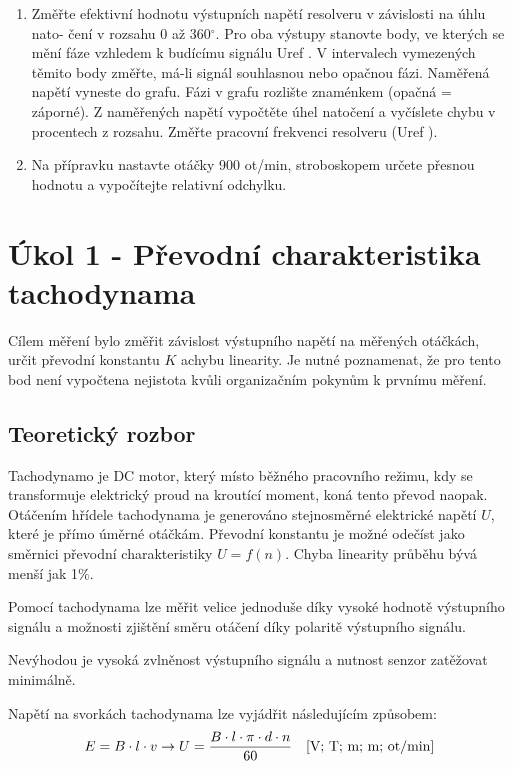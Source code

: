 \documentclass{protokol}
\begin{document}
\begin{enumerate}
        \item   Změřte efektivní hodnotu výstupních napětí resolveru v závislosti na úhlu nato-
                čení v rozsahu 0 až 360$^\circ$. Pro oba výstupy stanovte body, ve kterých se mění fáze
                vzhledem k budícímu signálu Uref . V intervalech vymezených těmito body změřte,
                má-li signál souhlasnou nebo opačnou fázi. Naměřená napětí vyneste do grafu. Fázi
                v grafu rozlište znaménkem (opačná = záporné). Z naměřených napětí vypočtěte
                úhel natočení a vyčíslete chybu v procentech z rozsahu. Změřte pracovní frekvenci
                resolveru (Uref ).

        \item   Na přípravku nastavte otáčky 900 ot/min, stroboskopem určete přesnou hodnotu a
                vypočítejte relativní odchylku.
    \end{enumerate}


\section{Úkol 1 - Převodní charakteristika tachodynama}
    Cílem měření bylo změřit závislost výstupního napětí na měřených otáčkách, určit převodní konstantu $K$ achybu linearity. Je nutné poznamenat, 
    že pro tento bod není vypočtena nejistota kvůli organizačním pokynům k prvnímu měření. 
    \subsection{Teoretický rozbor}
    Tachodynamo je DC motor, který místo běžného pracovního režimu, kdy se transformuje elektrický proud na kroutící moment, koná tento převod naopak.
    Otáčením hřídele tachodynama je generováno stejnosměrné elektrické napětí $U$, které je přímo úměrné otáčkám. Převodní konstantu je možné
    odečíst jako směrnici převodní charakteristiky $U = f(n)$. Chyba linearity průběhu bývá menší jak 1$\%$\cite{navod}.

    Pomocí tachodynama lze měřit velice jednoduše díky vysoké hodnotě výstupního signálu a možnosti zjištění směru otáčení díky polaritě výstupního signálu. 
    
    Nevýhodou je vysoká zvlněnost výstupního signálu a nutnost senzor zatěžovat minimálně. 

    Napětí na svorkách tachodynama lze vyjádřit následujícím způsobem:
    \begin{equation}
        E = B \cdot l \cdot v \rightarrow U = \dfrac{B \cdot l \cdot \pi \cdot d \cdot n}{60} \text{\quad [V; T; m; m; ot/min]}
    \end{equation}  
    
\end{document}
